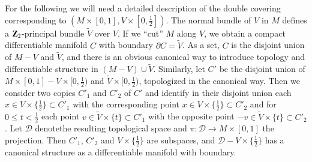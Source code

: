 For the following we will need a detailed description of the double covering corresponding to $(M\times [0,1],V\times [0,\frac{1}{2}])$. The normal bundle of $V$ in $M$ defines a $\mathbf{Z}_{2}$-principal bundle $\widetilde{V}$ over $V$. If we ``cut'' $M$ along $V$, we obtain a compact differentiable manifold $C$ with boundary $\partial C=\widetilde{V}$. As a set, $C$ is the disjoint union of $M-V$ and $\widetilde{V}$, and there is an obvious canonical way to introduce topology and differentiable structure in $(M-V)\cup \widetilde{V}$. Similarly, let $C'$ be the disjoint union of $M\times [0,1]-V\times [0,\frac{1}{2})$ and $\widetilde{V}\times [0,\frac{1}{2})$, topologized in the canonical way. Then we consider two copies $C'_{1}$ and $C'_{2}$ of $C'$ and identify in their disjoint union each $x\in V\times \{\frac{1}{2}\}\subset C'_{1}$ with the corresponding point $x\in V\times \{\frac{1}{2}\}\subset C'_{2}$ and for $0\leq t<\frac{1}{2}$ each point $v\in \widetilde{V}\times \{t\}\subset C'_{1}$ with the opposite point $-v\in \widetilde{V}\times \{t\}\subset C'_{2}$. Let $\mathscr{D}$ denote\pageoriginale the resulting topological space and $\pi:\mathscr{D}\to M\times [0,1]$ the projection. Then $C'_{1}$, $C'_{2}$ and $V\times \{\frac{1}{2}\}$ are subspaces, and $\mathscr{D}-V\times \{\frac{1}{2}\}$ has a canonical structure as a differentiable manifold with boundary.

